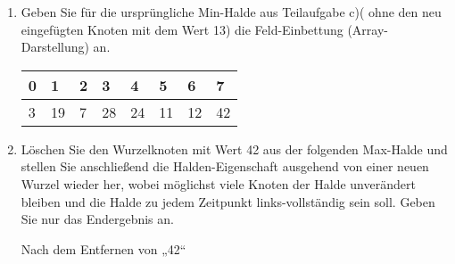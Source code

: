 \documentclass{bschlangaul-aufgabe}
\begin{document}
\begin{enumerate}
\begin{liDiagramm}{Nach Vertauschen von „13“ und „28“}
\end{liDiagramm}

\begin{liDiagramm}{Nach Vertauschen von „13“ und „19“}

\end{liDiagramm}


\item Geben Sie für die ursprüngliche Min-Halde aus Teilaufgabe c)(\dh
ohne den neu eingefügten Knoten mit dem Wert 13) die Feld-Einbettung
(Array-Darstellung) an.

\begin{liAntwort}
\begin{tabular}{llllllll}
\bf{0} & \bf{1} & \bf{2} & \bf{3} & \bf{4} & \bf{5} & \bf{6} & \bf{7} \\
\hline
3      & 19     & 7      & 28     & 24     & 11     & 12     & 42     \\
\end{tabular}
\end{liAntwort}


\item Löschen Sie den Wurzelknoten mit Wert 42 aus der folgenden
Max-Halde und stellen Sie anschließend die Halden-Eigenschaft ausgehend
von einer neuen Wurzel wieder her, wobei möglichst viele Knoten der
Halde unverändert bleiben und die Halde zu jedem Zeitpunkt
links-vollständig sein soll. Geben Sie nur das Endergebnis an.

\begin{center}
\end{center}

\begin{liDiagramm}{Nach dem Entfernen von „42“}
\end{liDiagramm}


\end{enumerate}
\end{document}
